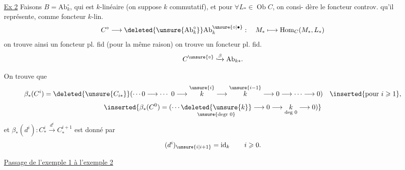 \uline{Ex 2} Faisons $B=\mathrm{Ab}_k^\circ$,
qui est $k$-linéaire (on suppose
$k$ commutatif), et pour $\forall L_*\in\operatorname{Ob}C$, on consi-
dère le foncteur controv. qu'il représente, 
comme foncteur $k$-lin.
\[
C^\circ\longrightarrow\deleted{\unsure{\mathrm{Ab}^\circ_k}}\mathrm{Ab}_k^{\unsure{\circ|\bullet}}:
\quad M_*\longmapsto\operatorname{Hom}_C(M_*,L_*)
\]
on trouve ainsi un foncteur pl. fid (pour la
même raison)
on trouve un foncteur pl. fid.
\[
C^{\unsure{\circ}}\lhook\joinrel\xrightarrow{\beta}\mathrm{Ab}_{k*}.
\]

On trouve que
\[
\beta_*(C^i)=\deleted{\unsure{C_{i*}}}
(\cdots0\longrightarrow\cdots\ 0\longrightarrow
\overset{\unsure{i}}{k}\longrightarrow\overset{\unsure{i-1}}{k}\longrightarrow0\longrightarrow\cdots\longrightarrow0)
\quad\inserted{\text{pour }i\geqslant1},
\]
\[
\inserted{\beta_*(C^0)=(\cdots\underset{\unsure{\text{degr }0}}{\deleted{\unsure{k}}}\longrightarrow0\longrightarrow\underset{\text{deg }0}{k}\longrightarrow0)}
\]
et $\beta_*(d^i):C^i_*\xrightarrow{d^i}C^{i+1}_*$
est donné par
\[
(d^i)_{\unsure{i|i+1}}=\operatorname{id}_k\qquad i\geqslant0.
\]

\uline{Passage de l'exemple 1 à l'exemple 2}

